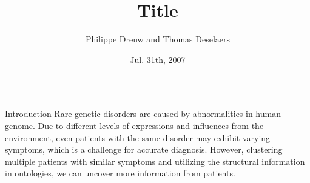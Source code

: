 \documentclass[final]{beamer} %
\title[]{{\fontsize{240}{240}\selectfont Title}}
\author[]{Philippe Dreuw and Thomas Deselaers}
\institute[RWTH Aachen University]{Human Language Technology and Pattern Recognition,RWTH Aachen University}
\date{Jul. 31th, 2007}
\begin{document}
  \begin{frame}{}
  \maketitle
    \begin{columns}[T]
      \begin{column}{0.3\linewidth}
    \begin{block}{\Huge Introduction}
    \Large
    Rare genetic disorders are caused by abnormalities in human genome. Due to different levels of expressions and influences from the environment, even patients with the same disorder may exhibit varying symptoms, which is a challenge for accurate diagnosis. However, clustering multiple patients with similar symptoms and utilizing the structural information in ontologies, we can uncover more information from patients.
   \vspace{3cm}

    \end{block}
    

\end{column}
\end{columns}
\end{frame}
\end{document}
